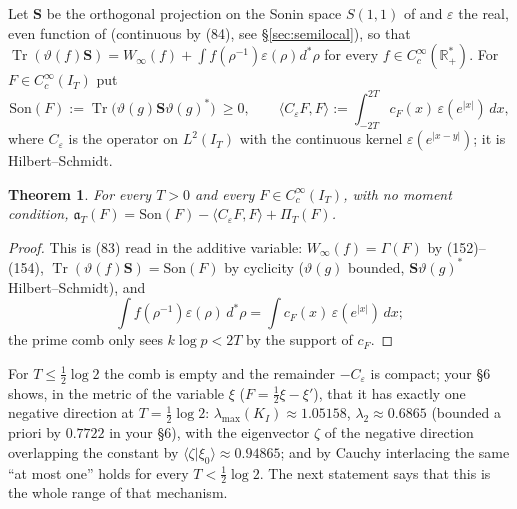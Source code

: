 \documentclass[11pt]{amsart}
\newtheorem{theorem}{Theorem}[section]
\theoremstyle{definition}
\theoremstyle{remark}
\newcommand{\R}{\mathbb R}
\newcommand{\Tr}{\operatorname{Tr}}
\newcommand{\IT}{I_T}
\newcommand{\cF}{c_F}
\newcommand{\PiT}{\Pi_T}
\newcommand{\Son}{\mathrm{Son}}
\begin{document}
Let $\mathbf S$ be the orthogonal projection on the Sonin space $S(1,1)$ of \cite[Def.~4.4]{CC2021} and
$\varepsilon$ the real, even function of \cite[Thm.~4.7, (83)--(84)]{CC2021} (continuous by (84), see \S\ref{sec:semilocal}), so that
$\Tr(\vartheta(f)\mathbf S)=W_\infty(f)+\int f(\rho^{-1})\varepsilon(\rho)d^*\rho$ for every
$f\in C_c^\infty(\R_+^*)$. For $F\in C_c^\infty(\IT)$ put
\[
\Son(F):=\Tr\big(\vartheta(g)\mathbf S\vartheta(g)^*\big)\ \ge0,\qquad
\langle C_\varepsilon F,F\rangle:=\int_{-2T}^{2T}\cF(x)\,\varepsilon(e^{|x|})\,dx ,
\]
where $C_\varepsilon$ is the operator on $L^2(\IT)$ with the continuous kernel $\varepsilon(e^{|x-y|})$; it is
Hilbert--Schmidt.

\begin{theorem}\label{thm:split}
For every $T>0$ and every $F\in C_c^\infty(\IT)$, with no moment condition,
$\mathfrak a_T(F)=\Son(F)-\langle C_\varepsilon F,F\rangle+\PiT(F)$.
\end{theorem}
\begin{proof}
This is (83) read in the additive variable: $W_\infty(f)=\Gamma(F)$ by (152)--(154), $\Tr(\vartheta(f)\mathbf S)=\Son(F)$ by
cyclicity ($\vartheta(g)$ bounded, $\mathbf S\vartheta(g)^*$ Hilbert--Schmidt), and
\[\int f(\rho^{-1})\varepsilon(\rho)\,d^*\rho=\int\cF(x)\,\varepsilon(e^{|x|})\,dx;\]
the prime comb only sees $k\log p<2T$ by the
support of $\cF$.
\end{proof}

For $T\le\frac12\log2$ the comb is empty and the remainder $-C_\varepsilon$ is compact; your \S6 shows, in the
metric of the variable $\xi$ ($F=\frac12\xi-\xi'$), that it has exactly one negative direction at $T=\frac12\log2$:
$\lambda_{\max}(K_I)\approx1.05158$, $\lambda_2\approx0.6865$ (bounded a priori by $0.7722$ in your \S6), with the eigenvector $\zeta$ of the negative direction overlapping the constant by $\langle\zeta|\xi_0\rangle\approx0.94865$; and by Cauchy interlacing the same ``at most one''
holds for every $T<\frac12\log2$. The next statement says that this is the whole range of that mechanism.
\end{document}
